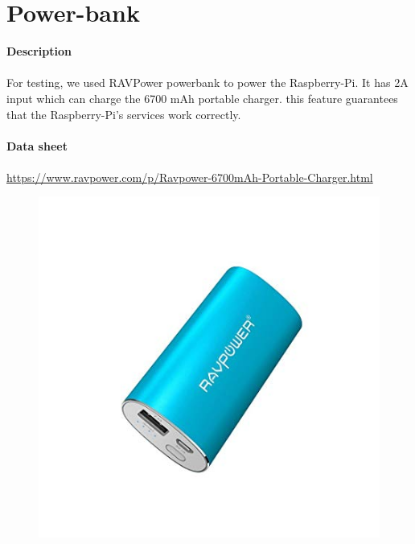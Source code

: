\documentclass[12pt]{report}
\begin{document}
\section{Power-bank}
\textbf{Description}
\paragraph{}
For testing, we used RAVPower powerbank to power the Raspberry-Pi. It has 2A input which can charge the 6700 mAh portable charger. this feature guarantees that the Raspberry-Pi's services work correctly. \\ \\
\textbf{Data sheet} 
\paragraph{}
\url{https://www.ravpower.com/p/Ravpower-6700mAh-Portable-Charger.html}
\begin{figure}[H]
	\begin{center}
		\includegraphics[scale=0.6]{res/power.jpg}
	\end{center}
\end{figure}
\end{document}
